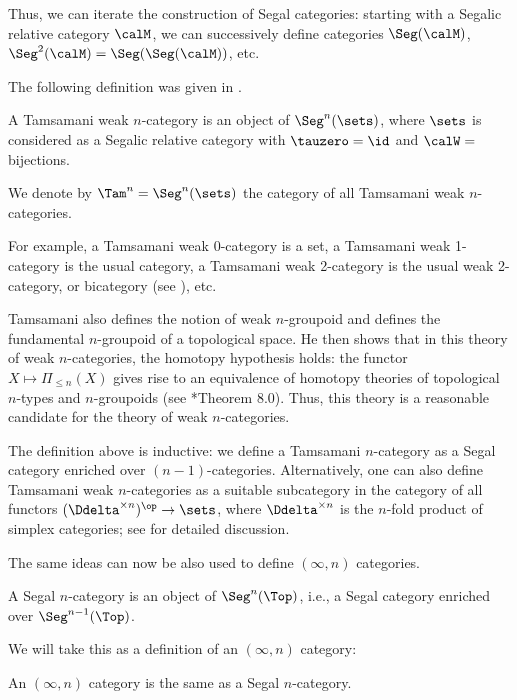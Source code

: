Thus, we can iterate the construction of Segal categories: starting with a
Segalic relative category $\calM$, we can successively define categories
$\Seg(\calM)$, $\Seg^2(\calM)=\Seg(\Seg(\calM))$, etc.

The following definition was given in .
\begin{definition}
  A Tamsamani weak $n$-category is an object of $\Seg^n(\sets)$, where $\sets$
  is considered as a Segalic relative category with $\tauzero=\id$ and $\calW=$bijections.

  We denote by $\Tam^n=\Seg^n(\sets)$ the category of all Tamsamani weak
  $n$-categories.
\end{definition}
For example, a Tamsamani weak $0$-category is a set, a Tamsamani weak 1-category
is the usual category, a Tamsamani weak 2-category is the usual weak 2-category,
or bicategory (see ), etc.

Tamsamani also defines the notion of weak $n$-groupoid and defines the
fundamental $n$-groupoid of a topological space. He then shows that in this
theory of weak $n$-categories, the homotopy hypothesis holds: the functor
$X\mapsto \Pi_{\leq n}(X)$ gives rise to an equivalence of homotopy theories of
topological $n$-types and $n$-groupoids (see *{Theorem 8.0}).
Thus, this theory is a reasonable candidate for the theory of weak
$n$-categories.

\begin{remark}
  The definition above is inductive: we define a Tamsamani $n$-category as a
  Segal category enriched over $(n-1)$-categories. Alternatively, one can also
  define Tamsamani weak $n$-categories as a suitable subcategory in the category
  of all functors $(\Ddelta^{\times n})^\op\to \sets$, where $\Ddelta^{\times
  n}$ is the $n$-fold product of simplex categories; see  for detailed
  discussion.
\end{remark}

The same ideas can now be also used to define $(\infty, n)$ categories.


\begin{definition}\label{d:segal-ncat}
  A Segal $n$-category is an object of $\Seg^n(\Top)$, i.e., a Segal category
  enriched over $\Seg^{n-1}(\Top)$.
\end{definition}


We will take this as a definition of an $(\infty, n)$ category:
\begin{definition}\label{d:infty-ncat}
  An $(\infty, n)$ category is the same as a Segal $n$-category.
\end{definition}


